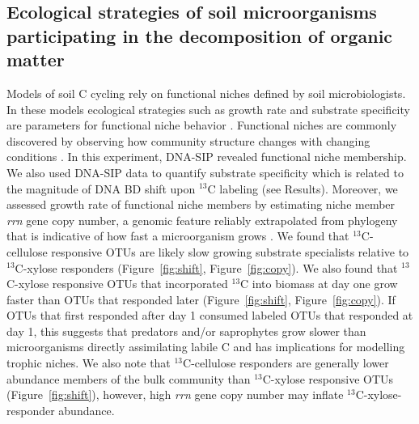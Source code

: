 \subsection{Ecological strategies of soil microorganisms participating in the
decomposition of organic matter}
Models of soil C cycling rely on functional niches defined by soil
microbiologists. In these models ecological strategies such as growth rate and
substrate specificity are parameters for functional niche behavior
\citep{Kaiser2014a}. Functional niches are commonly discovered by observing how
community structure changes with changing conditions
\cite{Fierer2007}. In this experiment, DNA-SIP revealed functional niche
membership. We also used DNA-SIP data to quantify substrate specificity which
is related to the magnitude of DNA BD shift upon $^{13}$C labeling (see
Results). Moreover, we assessed growth rate of functional niche members by
estimating niche member \textit{rrn} gene copy number, a genomic feature
reliably extrapolated from phylogeny that is indicative of how fast
a microorganism grows \citep{11125085,Kembel_2012}. We found that
$^{13}$C-cellulose responsive OTUs are likely slow growing substrate
specialists relative to $^{13}$C-xylose responders (Figure~\ref{fig:shift},
Figure~\ref{fig:copy}). We also found that $^{13}$C-xylose responsive OTUs that
incorporated $^{13}$C into biomass at day one grow faster than OTUs that
responded later (Figure~\ref{fig:shift}, Figure~\ref{fig:copy}). If OTUs that
first responded after day 1 consumed labeled OTUs that responded at day 1, this
suggests that predators and/or saprophytes grow slower than microorganisms
directly assimilating labile C and has implications for modelling trophic
niches. We also note that $^{13}$C-cellulose responders are generally lower
abundance members of the bulk community than $^{13}$C-xylose responsive OTUs
(Figure~\ref{fig:shift}), however, high \textit{rrn} gene copy number may
inflate $^{13}$C-xylose-responder abundance.

